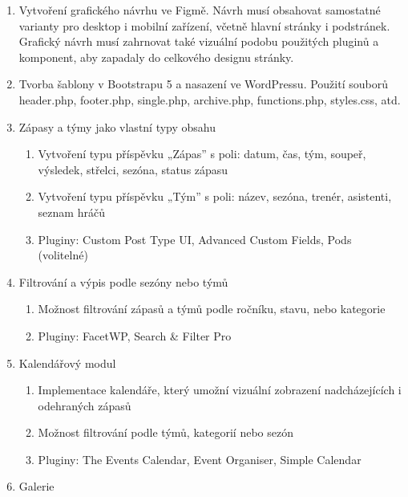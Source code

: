 \begin{enumerate}
\def\labelenumi{\arabic{enumi}.}
\item
  Vytvoření grafického návrhu ve Figmě. Návrh musí obsahovat samostatné
  varianty pro desktop i mobilní zařízení, včetně hlavní stránky i
  podstránek. Grafický návrh musí zahrnovat také vizuální podobu
  použitých pluginů a komponent, aby zapadaly do celkového designu
  stránky.
\item
  Tvorba šablony v Bootstrapu 5 a nasazení ve WordPressu. Použití
  souborů header.php, footer.php, single.php, archive.php,
  functions.php, styles.css, atd.
\item
  Zápasy a týmy jako vlastní typy obsahu

  \begin{enumerate}
  \def\labelenumii{\alph{enumii}.}
  \tightlist
  \item
    Vytvoření typu příspěvku „Zápas'' s poli: datum, čas, tým, soupeř,
    výsledek, střelci, sezóna, status zápasu
  \item
    Vytvoření typu příspěvku „Tým'' s poli: název, sezóna, trenér,
    asistenti, seznam hráčů
  \item
    Pluginy: Custom Post Type UI, Advanced Custom Fields, Pods
    (volitelné)
  \end{enumerate}
\item
  Filtrování a výpis podle sezóny nebo týmů

  \begin{enumerate}
  \def\labelenumii{\alph{enumii}.}
  \tightlist
  \item
    Možnost filtrování zápasů a týmů podle ročníku, stavu, nebo
    kategorie
  \item
    Pluginy: FacetWP, Search \& Filter Pro
  \end{enumerate}
\item
  Kalendářový modul

  \begin{enumerate}
  \def\labelenumii{\alph{enumii}.}
  \tightlist
  \item
    Implementace kalendáře, který umožní vizuální zobrazení
    nadcházejících i odehraných zápasů
  \item
    Možnost filtrování podle týmů, kategorií nebo sezón
  \item
    Pluginy: The Events Calendar, Event Organiser, Simple Calendar
  \end{enumerate}
\item
  Galerie


\end{enumerate}
